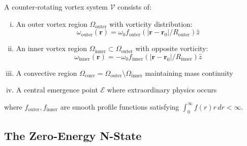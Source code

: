 \begin{definition}\label{def:counter-rotating}
A counter-rotating vortex system $\mathcal{V}$ consists of:
\begin{enumerate}[(i)]
\item An outer vortex region $\Omega_{\text{outer}}$ with vorticity distribution:
\begin{equation}
\omega_{\text{outer}}(\mathbf{r}) = \omega_0 f_{\text{outer}}(|\mathbf{r} - \mathbf{r}_0|/R_{\text{outer}}) \hat{z}
\end{equation}

\item An inner vortex region $\Omega_{\text{inner}} \subset \Omega_{\text{outer}}$ with opposite vorticity:
\begin{equation}
\omega_{\text{inner}}(\mathbf{r}) = -\omega_0 f_{\text{inner}}(|\mathbf{r} - \mathbf{r}_0|/R_{\text{inner}}) \hat{z}
\end{equation}

\item A convective region $\Omega_{\text{conv}} = \Omega_{\text{outer}} \setminus \Omega_{\text{inner}}$ maintaining mass continuity

\item A central emergence point $\mathcal{E}$ where extraordinary physics occurs
\end{enumerate}
where $f_{\text{outer}}, f_{\text{inner}}$ are smooth profile functions satisfying $\int_0^\infty f(r) r \, dr < \infty$.
\end{definition}

\subsection{The Zero-Energy N-State}

